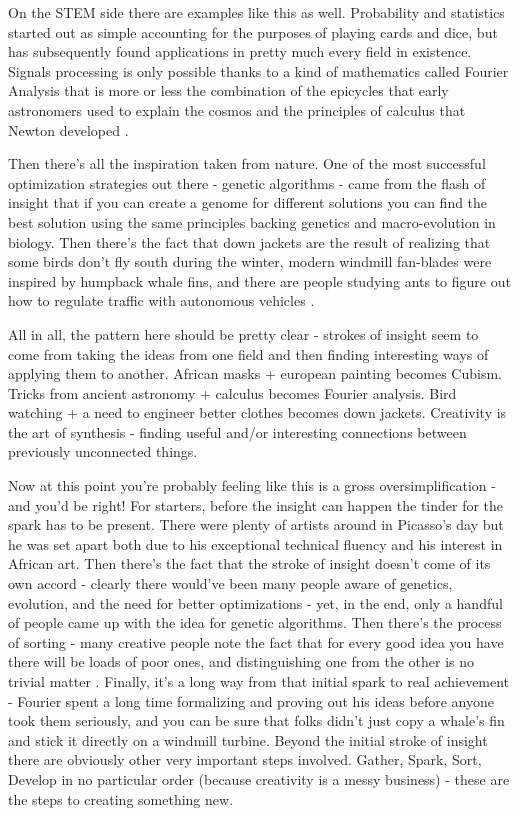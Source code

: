 \documentclass[11pt,a5paper]{book}
\begin{document}
On the STEM side there are examples like this as well. Probability and statistics started out as simple accounting for the purposes of playing cards and dice, but has subsequently found applications in pretty much every field in existence. Signals processing is only possible thanks to a kind of mathematics called Fourier Analysis that is more or less the combination of the epicycles that early astronomers used to explain the cosmos and the principles of calculus that Newton developed \cite{gnu}. 
\newline

Then there's all the inspiration taken from nature. One of the most successful optimization strategies out there - genetic algorithms - came from the flash of insight that if you can create a genome for different solutions you can find the best solution using the same principles backing genetics and macro-evolution in biology. Then there's the fact that down jackets are the result of realizing that some birds don't fly south during the winter, modern windmill fan-blades were inspired by humpback whale fins, and there are people studying ants to figure out how to regulate traffic with autonomous vehicles \cite{biomimicry}.
\newline

All in all, the pattern here should be pretty clear - strokes of insight seem to come from taking the ideas from one field and then finding interesting ways of applying them to another. African masks + european painting becomes Cubism. Tricks from ancient astronomy + calculus becomes Fourier analysis. Bird watching + a need to engineer better clothes becomes down jackets. Creativity is the art of synthesis - finding useful and/or interesting connections between previously unconnected things.
\newline 

Now at this point you're probably feeling like this is a gross oversimplification - and you'd be right! For starters, before the insight can happen the tinder for the spark has to be present. There were plenty of artists around in Picasso's day but he was set apart both due to his exceptional technical fluency and his interest in African art. Then there's the fact that the stroke of insight doesn't come of its own accord - clearly there would've been many people aware of genetics, evolution, and the need for better optimizations - yet, in the end, only a handful of people came up with the idea for genetic algorithms. Then there's the process of sorting - many creative people note the fact that for every good idea you have there will be loads of poor ones, and distinguishing one from the other is no trivial matter \cite{kaufman}. Finally, it's a long way from that initial spark to real achievement - Fourier spent a long time formalizing and proving out his ideas before anyone took them seriously, and you can be sure that folks didn't just copy a whale's fin and stick it directly on a windmill turbine. Beyond the initial stroke of insight there are obviously other very important steps involved. Gather, Spark, Sort, Develop in no particular order (because creativity is a messy business) - these are the steps to creating something new. 
\newline
\end{document}

